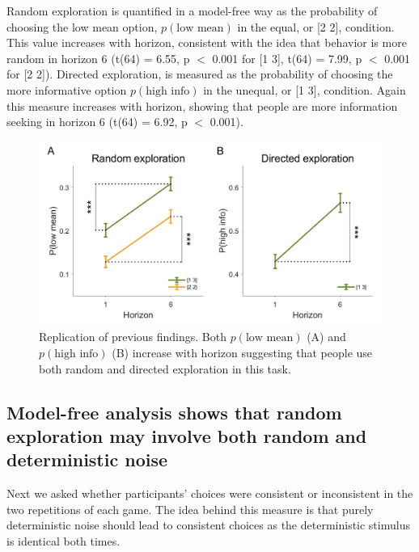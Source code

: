 \documentclass[12pt]{article}
\begin{document}
	Random exploration is quantified in a model-free way as the probability of choosing the low mean option, $p(\mbox{low mean})$ in the equal, or [2 2], condition. This value increases with horizon, consistent with the idea that behavior is more random in horizon 6 (t(64) = 6.55, p $<$ 0.001 for [1 3], t(64) = 7.99, p $<$ 0.001 for [2 2]).  Directed exploration, is measured as the probability of choosing the more informative option $p(\mbox{high info})$ in the unequal, or [1 3], condition. Again this measure increases with horizon, showing that people are more information seeking in horizon 6 (t(64) = 6.92, p $<$ 0.001).
	
	\begin{figure}[H]
		\begin{center}
			\includegraphics[width=\textwidth]{figures/RanDetNoise_modelfree.jpg}
			\caption{
				Replication of previous findings. Both  $p(\mbox{low mean})$ (A) and $p(\mbox{high info})$ (B) increase with horizon suggesting that people use both random and directed exploration in this task.  }
			\label{fig:modelfree}
		\end{center}
	\end{figure}
	
	\subsection*{Model-free analysis shows that random exploration may involve both random and deterministic noise}
	
	Next we asked whether participants' choices were consistent or inconsistent in the two repetitions of each game. The idea behind this measure is that purely deterministic noise should lead to consistent choices as the deterministic stimulus is identical both times. 
	
\end{document}
